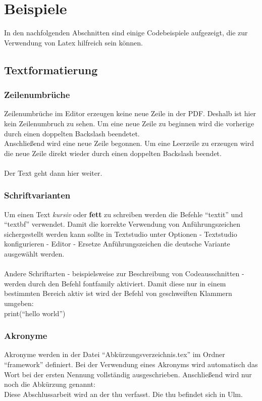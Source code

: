 \chapter{Beispiele}
In den nachfolgenden Abschnitten sind einige Codebeispiele aufgezeigt, die zur Verwendung von Latex hilfreich sein können.

\section{Textformatierung}

\subsection{Zeilenumbrüche}
Zeilenumbrüche im Editor erzeugen keine neue Zeile in der PDF. 
Deshalb ist hier kein Zeilenumbruch zu sehen.
Um eine neue Zeile zu beginnen wird die vorherige durch einen doppelten Backslash beendetet.\\
Anschließend wird eine neue Zeile begonnen. 
Um eine Leerzeile zu erzeugen wird die neue Zeile direkt wieder durch einen doppelten Backslash beendet.\\
\\
Der Text geht dann hier weiter.

\subsection{Schriftvarianten}
Um einen Text \textit{kursiv} oder \textbf{fett} zu schreiben werden die Befehle "`textit"' und "`textbf"' verwendet. Damit die korrekte Verwendung von Anführungszeichen sichergestellt werden kann sollte in Textstudio unter Optionen - Textstudio konfigurieren - Editor - Ersetze Anführungszeichen die deutsche Variante ausgewählt werden.\\
\\
Andere Schriftarten - beispielsweise zur Beschreibung von Codeausschnitten - werden durch den Befehl fontfamily aktiviert. Damit diese nur in einem bestimmten Bereich aktiv ist wird der Befehl von geschweiften Klammern umgeben:\\
{\selectfont print("`hello world"')}

\subsection{Akronyme}
Akronyme werden in der Datei "`Abkürzungsverzeichnis.tex"' im Ordner "`framework"' definiert. Bei der Verwendung eines Akronyms wird automatisch das Wort bei der ersten Nennung vollständig ausgeschrieben. Anschließend wird nur noch die Abkürzung genannt:\\
Diese Abschlussarbeit wird an der \ac{thu} verfasst. Die \ac{thu} befindet sich in Ulm.
\\


